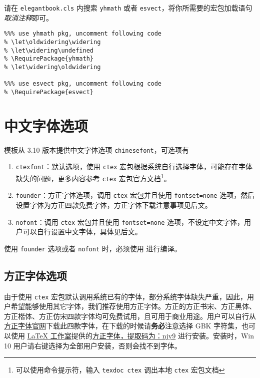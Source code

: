 \documentclass[cn,11pt]{elegantbook}
\begin{document}
请在 \lstinline{elegantbook.cls} 内搜索 \lstinline{yhmath} 或者 \lstinline{esvect}，将你所需要的宏包加载语句\textit{取消注释}即可。
\begin{lstlisting}
%%% use yhmath pkg, uncomment following code
% \let\oldwidering\widering
% \let\widering\undefined
% \RequirePackage{yhmath}
% \let\widering\oldwidering

%%% use esvect pkg, uncomment following code
% \RequirePackage{esvect}
\end{lstlisting}

\section{中文字体选项}
模板从 3.10 版本提供中文字体选项 \lstinline{chinesefont}，可选项有
\begin{enumerate}
\item \lstinline{ctexfont}：默认选项，使用 \lstinline{ctex} 宏包根据系统自行选择字体，可能存在字体缺失的问题，更多内容参考 \lstinline{ctex} 宏包\href{https://ctan.org/pkg/ctex}{官方文档}\footnote{可以使用命令提示符，输入 \lstinline{texdoc ctex} 调出本地 \lstinline{ctex} 宏包文档}。
\item \lstinline{founder}：方正字体选项，调用 \lstinline{ctex} 宏包并且使用 \lstinline{fontset=none} 选项，然后设置字体为方正四款免费字体，方正字体下载注意事项见后文。
\item \lstinline{nofont}：调用 \lstinline{ctex} 宏包并且使用 \lstinline{fontset=none} 选项，不设定中文字体，用户可以自行设置中文字体，具体见后文。
\end{enumerate}

\begin{remark}
  使用 \lstinline{founder} 选项或者 \lstinline{nofont} 时，必须使用  进行编译。
\end{remark}

\subsection{方正字体选项}
由于使用 \lstinline{ctex} 宏包默认调用系统已有的字体，部分系统字体缺失严重，因此，用户希望能够使用其它字体，我们推荐使用方正字体。方正的{\songti 方正书宋}、{\heiti 方正黑体}、{\kaishu 方正楷体}、{\fangsong 方正仿宋}四款字体均可免费试用，且可用于商业用途。用户可以自行从\href{http://www.foundertype.com/}{方正字体官网}下载此四款字体，在下载的时候请\textbf{务必}注意选择 GBK 字符集，也可以使用 \href{https://www.latexstudio.net/}{\LaTeX{} 工作室}提供的\href{https://pan.baidu.com/s/1BgbQM7LoinY7m8yeP25Y7Q}{方正字体，提取码为：njy9} 进行安装。安装时，{\kaishu Win 10 用户请右键选择为全部用户安装，否则会找不到字体。}
\end{document}
